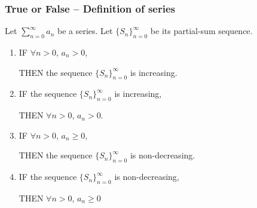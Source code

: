 \begin{frame}[t]
	\fontsize{12}{12}\selectfont
	\frametitle{True or False -- Definition of series}

	Let $\displaystyle \sum_{n=0}^{\infty}a_{n}$ be a series. Let
	$\displaystyle \{ S_{n}\}_{n=0}^{\infty}$ be its partial-sum sequence.

	\begin{enumerate}
		\addtocounter{enumi}{3}

		\item IF {\color{blue} $\displaystyle \forall n >0$, $\displaystyle a_{n}>0$},
			\vspace{.2cm}

			THEN {\color{red} the sequence $\displaystyle \{ S_{n}\}_{n=0}^{\infty}$ is increasing}.
			\vspace{.5cm}

		\item IF {\color{red} the sequence $\displaystyle \{ S_{n}\}_{n=0}^{\infty}$ is increasing},
			\\
			\vspace{.2cm}

			THEN {\color{blue} $\displaystyle \forall n >0$, $\displaystyle a_{n}>0$}.
			\vspace{.5cm}

		\item IF {\color{blue} $\displaystyle \forall n >0$, $\displaystyle a_{n}\geq0$},
			\vspace{.2cm}

			THEN {\color{red} the sequence $\displaystyle \{ S_{n}\}_{n=0}^{\infty}$ is non-decreasing}.

			\vspace{.5cm}

		\item IF {\color{red} the sequence $\displaystyle \{ S_{n}\}_{n=0}^{\infty}$ is non-decreasing},
			\\
			\vspace{.2cm}

			THEN {\color{blue} $\displaystyle \forall n >0$, $\displaystyle a_{n}\geq0$}
	\end{enumerate}
\end{frame}

